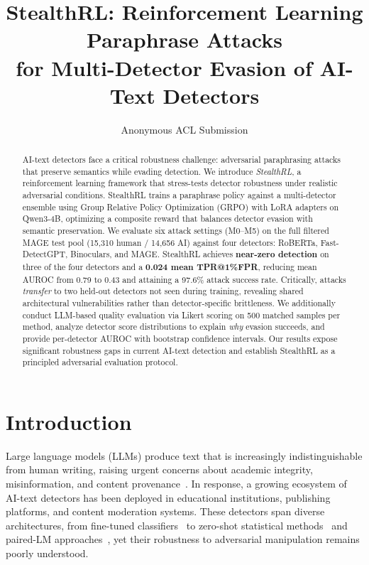 \documentclass[11pt]{article}
\title{\textbf{StealthRL: Reinforcement Learning Paraphrase Attacks\\for Multi-Detector Evasion of AI-Text Detectors}}
\author{Anonymous ACL Submission}
\date{}
\begin{document}
\maketitle

\begin{abstract}
AI-text detectors face a critical robustness challenge: adversarial paraphrasing attacks that preserve semantics while evading detection. We introduce \emph{StealthRL}, a reinforcement learning framework that stress-tests detector robustness under realistic adversarial conditions. StealthRL trains a paraphrase policy against a multi-detector ensemble using Group Relative Policy Optimization (GRPO) with LoRA adapters on Qwen3-4B, optimizing a composite reward that balances detector evasion with semantic preservation. We evaluate six attack settings (M0--M5) on the full filtered MAGE test pool (15,310 human / 14,656 AI) against four detectors: RoBERTa, Fast-DetectGPT, Binoculars, and MAGE. StealthRL achieves \textbf{near-zero detection} on three of the four detectors and a \textbf{0.024 mean TPR@1\%FPR}, reducing mean AUROC from 0.79 to 0.43 and attaining a 97.6\% attack success rate. Critically, attacks \emph{transfer} to two held-out detectors not seen during training, revealing shared architectural vulnerabilities rather than detector-specific brittleness. We additionally conduct LLM-based quality evaluation via Likert scoring on 500 matched samples per method, analyze detector score distributions to explain \emph{why} evasion succeeds, and provide per-detector AUROC with bootstrap confidence intervals. Our results expose significant robustness gaps in current AI-text detection and establish StealthRL as a principled adversarial evaluation protocol.
\end{abstract}

\section{Introduction}
\label{sec:intro}

Large language models (LLMs) produce text that is increasingly indistinguishable from human writing, raising urgent concerns about academic integrity, misinformation, and content provenance~\cite{solaiman2019release}. In response, a growing ecosystem of AI-text detectors has been deployed in educational institutions, publishing platforms, and content moderation systems. These detectors span diverse architectures, from fine-tuned classifiers~\cite{solaiman2019release} to zero-shot statistical methods~\cite{mitchell2023detectgptzeroshotmachinegeneratedtext, bao2024fastdetectgptefficientzeroshotdetection} and paired-LM approaches~\cite{hans2024spottingllmsbinocularszeroshot}, yet their robustness to adversarial manipulation remains poorly understood.
\end{document}
